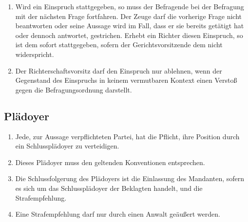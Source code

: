 \documentclass{article}
\begin{document}
\begin{enumerate}[(1)]
\begin{enumerate}[1.]
        \end{enumerate}
    \item Wird ein Einspruch stattgegeben, so muss der Befragende bei der Befragung mit der nächsten Frage fortfahren. Der Zeuge darf die vorherige Frage nicht beantworten oder seine Aussage wird im Fall, dass er sie bereits getätigt hat oder dennoch antwortet, gestrichen. Erhebt ein Richter diesen Einspruch, so ist dem sofort stattgegeben, sofern der Gerichtsvorsitzende dem nicht widerspricht. 
    \item Der Richterschaftsvorsitz darf den Einspruch nur ablehnen, wenn der Gegenstand des Einspruchs in keinem vermutbaren Kontext einen Verstoß gegen die Befragungsordnung darstellt.   
\end{enumerate}

\subsection{Plädoyer}\label{pleed}
\begin{enumerate}[(1)]
    \item Jede, zur Aussage verpflichteten Partei, hat die Pflicht, ihre Position durch ein Schlussplädoyer zu verteidigen.
    \item Dieses Plädoyer muss den geltenden Konventionen entsprechen.
    \item Die Schlussfolgerung des Plädoyers ist die Einlassung des Mandanten, sofern es sich um das Schlussplädoyer der Beklagten handelt, und die Strafempfehlung.
    \item Eine Strafempfehlung darf nur durch einen Anwalt geäußert werden.
\end{enumerate}
\end{document}
